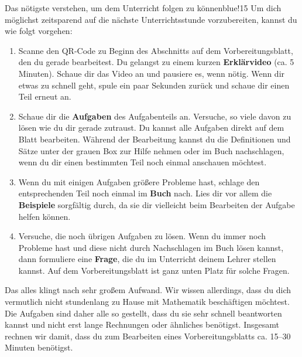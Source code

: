 \documentclass[../main.tex]{subfiles}
\begin{document}
\begin{goal}{Das nötigste verstehen, um dem Unterricht folgen zu können}{blue!15}
    Um dich möglichst zeitsparend auf die nächste Unterrichtsstunde vorzubereiten, kannst du wie folgt vorgehen:
    \begin{enumerate}
        \item[\tikzball{blue!50!black}{1}] Scanne den QR-Code zu Beginn des Abschnitts auf dem Vorbereitungsblatt, den du gerade bearbeitest. Du gelangst zu einem kurzen \textbf{Erklärvideo} (ca. 5 Minuten). Schaue dir das Video an und pausiere es, wenn nötig. Wenn dir etwas zu schnell geht, spule ein paar Sekunden zurück und schaue dir einen Teil erneut an.
        \item[\tikzball{blue!50!black}{2}] Schaue dir die \textbf{Aufgaben} des Aufgabenteils an. Versuche, so viele davon zu lösen wie du dir gerade zutraust. Du kannst alle Aufgaben direkt auf dem Blatt bearbeiten. Während der Bearbeitung kannst du die Definitionen und Sätze unter der grauen Box zur Hilfe nehmen oder im Buch nachschlagen, wenn du dir einen bestimmten Teil noch einmal anschauen möchtest.
        \item[\tikzball{blue!50!black}{3}] Wenn du mit einigen Aufgaben größere Probleme hast, schlage den entsprechenden Teil noch einmal im \textbf{Buch} nach. Lies dir vor allem die \textbf{Beispiele} sorgfältig durch, da sie dir vielleicht beim Bearbeiten der Aufgabe helfen können.
        \item[\tikzball{blue!50!black}{4}] Versuche, die noch übrigen Aufgaben zu lösen. Wenn du immer noch Probleme hast und diese nicht durch Nachschlagen im Buch lösen kannst, dann formuliere eine \textbf{Frage}, die du im Unterricht deinem Lehrer stellen kannst. Auf dem Vorbereitungsblatt ist ganz unten Platz für solche Fragen.
    \end{enumerate}
    Das alles klingt nach sehr großem Aufwand. Wir wissen allerdings, dass du dich vermutlich nicht stundenlang zu Hause mit Mathematik beschäftigen möchtest. Die Aufgaben sind daher alle so gestellt, dass du sie sehr schnell beantworten kannst und nicht erst lange Rechnungen oder ähnliches benötigst. Insgesamt rechnen wir damit, dass du zum Bearbeiten eines Vorbereitungsblatts ca. 15--30 Minuten benötigst.
\end{goal}
\end{document}
